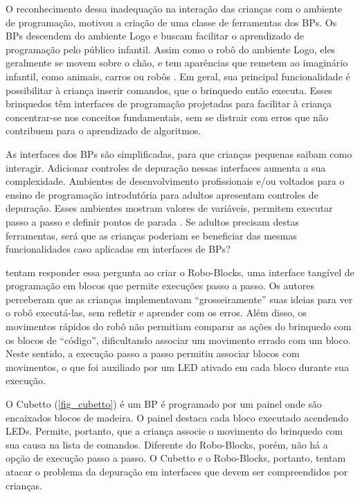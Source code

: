 O reconhecimento dessa inadequação na interação das crianças com o ambiente de programação, motivou a criação de uma classe de ferramentas dos \ac{BPs}. Os \ac{BPs} descendem do ambiente Logo e buscam facilitar o aprendizado de programação pelo público infantil. Assim como o robô do ambiente Logo, eles geralmente se movem sobre o chão, e tem aparências que remetem ao imaginário infantil, como animais, carros ou robôs \cite{raabe_2017_rope}. Em geral, sua principal funcionalidade é possibilitar à criança inserir comandos, que o brinquedo então executa. Esses brinquedos têm interfaces de programação projetadas para facilitar à criança concentrar-se nos conceitos fundamentais, sem se distrair com erros que não contribuem para o aprendizado de algoritmos.

As interfaces dos \ac{BPs} são simplificadas, para que crianças pequenas saibam como interagir. Adicionar controles de depuração nessas interfaces aumenta a sua complexidade. Ambientes de desenvolvimento profissionais e/ou voltados para o ensino de programação introdutória para adultos apresentam controles de depuração. Esses ambientes mostram valores de variáveis, permitem executar passo a passo e definir pontos de parada \cite{noschang_portugol_2014}. Se adultos precisam destas ferramentas, será que as crianças poderiam se beneficiar das mesmas funcionalidades caso aplicadas em interfaces de \ac{BPs}?

  tentam responder essa pergunta ao criar o Robo-Blocks, uma interface tangível de programação em blocos que permite execuções passo a passo. Os autores perceberam que as crianças implementavam “grosseiramente” suas ideias para ver o robô executá-las, sem refletir e aprender com os erros. Além disso, os movimentos rápidos do robô não permitiam comparar as ações do brinquedo com os blocos de “código”, dificultando associar um movimento errado com um bloco. Neste sentido, a execução passo a passo permitiu associar blocos com movimentos, o que foi auxiliado por um LED ativado em cada bloco durante sua execução. 
 
O Cubetto \cite{anzoategui_cubetto_2017} (\autoref{fig_cubetto}) é um \ac{BP} é programado por um painel onde são encaixados blocos de madeira. O painel destaca cada bloco executado acendendo LEDs. Permite, portanto, que a criança associe o movimento do brinquedo com sua causa na lista de comandos. Diferente do Robo-Blocks, porém, não há a opção de execução passo a passo. O Cubetto e o Robo-Blocks, portanto, tentam atacar o problema da depuração em interfaces que devem ser compreendidos por crianças.

